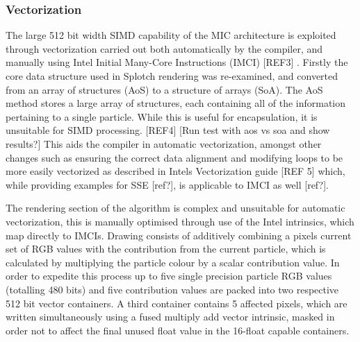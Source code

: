\documentclass[runningheads,a4paper]{llncs}
\begin{document}
\subsubsection{Vectorization}
\label{sect:vectorization}

The large 512 bit width SIMD capability of the MIC architecture is exploited through vectorization carried out both 
automatically by the compiler, and manually using Intel Initial Many-Core Instructions (IMCI) [REF3] . Firstly the 
core data structure used in Splotch rendering was re-examined, and converted from an array of structures (AoS) to 
a structure of arrays (SoA). The AoS method stores a large array of structures, each containing all of the 
information pertaining to a single particle. While this is useful for encapsulation, it is unsuitable for SIMD 
processing. [REF4] [Run test with aos vs soa and show results?] This aids the compiler in automatic vectorization, 
amongst other changes such as ensuring the correct data alignment and modifying loops to be more easily vectorized 
as described in Intels Vectorization guide [REF 5] which, while providing examples for SSE [ref?], is applicable 
to IMCI as well [ref?]. 

The rendering section of the algorithm is complex and unsuitable for automatic vectorization, this is manually 
optimised through use of the Intel intrinsics, which map directly to IMCIs. Drawing consists of additively 
combining a pixels current set of RGB values with the contribution from the current particle, which is calculated by 
multiplying the particle colour by a scalar contribution value. In order to expedite this process up to five single 
precision particle RGB values (totalling 480 bits) and five contribution values are packed into two respective 
512 bit vector containers. A third container contains 5 affected pixels, which are written simultaneously using a 
fused multiply add vector intrinsic, masked in order not to affect the final unused float value in the 16-float 
capable containers.

\end{document}
